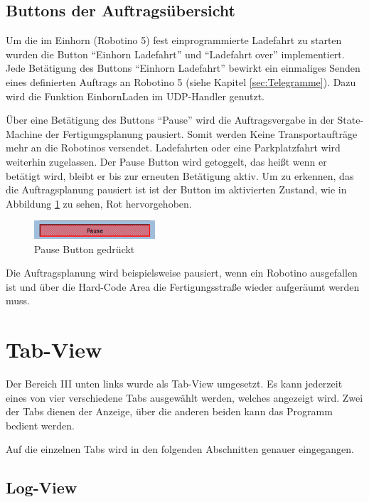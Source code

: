 \subsection{Buttons der Auftragsübersicht}

Um die im Einhorn (Robotino 5) fest einprogrammierte Ladefahrt zu starten wurden die Button "`Einhorn Ladefahrt"' und "`Ladefahrt over"' implementiert. Jede Betätigung des Buttons  "`Einhorn Ladefahrt"' bewirkt ein einmaliges Senden eines definierten Auftrags an Robotino 5 (siehe Kapitel \ref{sec:Telegramme}). Dazu wird die Funktion EinhornLaden im UDP-Handler genutzt. 
 
Über eine Betätigung des Buttons "`Pause"' wird die Auftragsvergabe in der State-Machine der Fertigungsplanung pausiert. Somit werden Keine Transportaufträge mehr an die Robotinos versendet. Ladefahrten oder eine Parkplatzfahrt wird weiterhin zugelassen. Der Pause Button wird getoggelt, das heißt wenn er betätigt wird, bleibt er bis zur erneuten Betätigung aktiv. Um zu erkennen, das die Auftragsplanung pausiert ist ist der Button im aktivierten Zustand, wie in Abbildung \ref{fig:Pause} zu sehen, Rot hervorgehoben.

\begin{figure}[htb]
    \centering
    \includegraphics[width=0.4\textwidth]{Abbildungen/Pause.png}
    \caption{Pause Button gedrückt}		
    \label{fig:Pause}
\end{figure}

Die Auftragsplanung wird beispielsweise pausiert, wenn ein Robotino ausgefallen ist und über die Hard-Code Area die Fertigungsstraße wieder aufgeräumt werden muss. 

\section{Tab-View}

Der Bereich III unten links wurde als Tab-View umgesetzt. Es kann jederzeit eines von vier verschiedene Tabs ausgewählt werden, welches angezeigt wird. Zwei der Tabs dienen der Anzeige, über die anderen beiden kann das Programm bedient werden. 

Auf die einzelnen Tabs wird in den folgenden Abschnitten genauer eingegangen. 

\subsection{Log-View}

